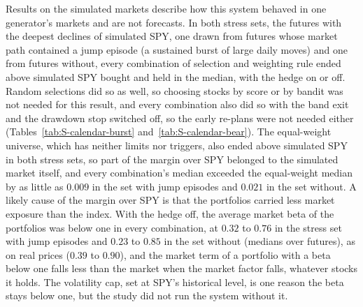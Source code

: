 Results on the simulated markets describe how this system behaved in one generator's markets and are not forecasts.
In both stress sets, the futures with the deepest declines of simulated SPY, one drawn from futures whose market path
contained a jump episode (a sustained burst of large daily moves) and one from futures without, every combination of
selection and weighting rule ended above simulated SPY bought and held in the median, with the hedge on or off.
Random selections did so as well, so choosing stocks by score or by bandit was not needed for this result, and every
combination also did so with the band exit and the drawdown stop switched off, so the early re-plans were not needed
either (Tables~\ref{tab:S-calendar-burst} and~\ref{tab:S-calendar-bear}). The equal-weight universe,
which has neither limits nor triggers, also ended above simulated SPY in both stress sets, so part of the margin over
SPY belonged to the simulated market itself, and every combination's median exceeded the equal-weight median by as
little as $0.009$ in the set with jump episodes and $0.021$ in the set without. A likely cause of the margin over SPY is
that the portfolios carried less market exposure than the index. With the hedge off, the average market beta of the
portfolios was below one in every combination, at $0.32$ to $0.76$ in the stress set with jump episodes and $0.23$ to
$0.85$ in the set without (medians over futures), as on real prices ($0.39$ to $0.90$), and the market term of a
portfolio with a beta below one falls less than the market when the market factor falls, whatever stocks it holds.
The volatility cap, set at SPY's historical level, is one reason the beta stays below one, but the study did not run
the system without it.


